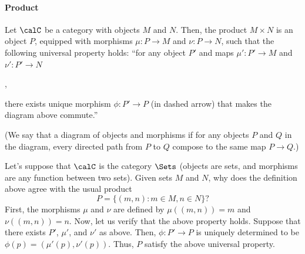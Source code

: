 \paragraph{Product}
Let $\calC$ be a category with objects $M$ and $N$.
Then, the product $M\times N$ is an object $P$, 
equipped with morphisms $\mu : P\to M$
and $\nu : P\to N$, such that the following universal property holds:
``for any object $P'$ and maps $\mu' : P'\to M$
and $\nu' : P'\to N$
\begin{center}
,
\end{center}
there exists unique morphism $\phi : P'\to P$ 
(in dashed arrow) that makes the diagram above commute.''

(We say that a diagram of objects and morphisms 
if for any objects $P$ and $Q$ in the diagram,
every directed path from $P$ to $Q$ compose to the same 
map $P\to Q$.)

Let's suppose that $\calC$ is the category $\Sets$
(objects are sets, and morphisms are any function
between two sets). Given sets $M$ and $N$,
why does the definition above agree with the usual product
$$P = \{(m,n) : m\in M, n\in N\}?$$
First, the morphisms $\mu$ and $\nu$ are defined by
$\mu((m,n)) = m$ and $\nu((m,n)) = n$.
Now, let us verify that the above property holds.
Suppose that there exists $P'$, $\mu'$, and $\nu'$ as above.
Then, $\phi : P'\to P$ is uniquely determined to be 
$\phi(p) = (\mu'(p), \nu'(p))$.
Thus, $P$ satisfy the above universal property.

